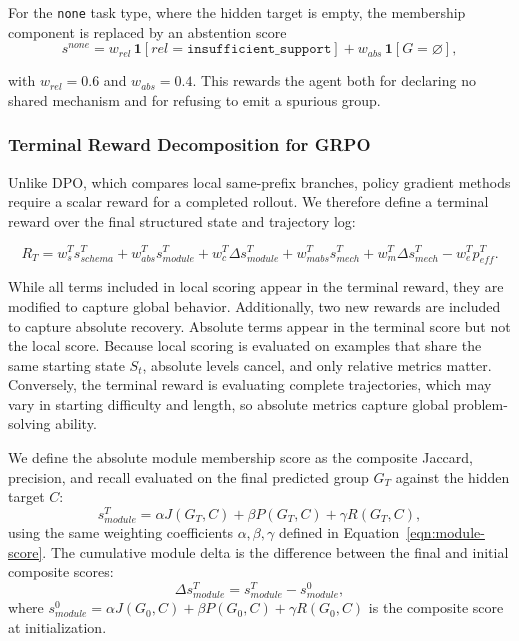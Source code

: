 \documentclass[thesis,letterpaper,12pt]{utthesis}
\begin{document}
For the \texttt{none} task type, where the hidden target is empty, the membership component is replaced by an abstention score
\[
    s^{none} = w_{rel}\, \mathbf{1}[rel = \texttt{insufficient\_support}] + w_{abs}\, \mathbf{1}[G = \varnothing],
\]

with $w_{rel} = 0.6$ and $w_{abs} = 0.4$. This rewards the agent both for declaring no shared mechanism and for refusing to emit a spurious group.

\subsubsection{Terminal Reward Decomposition for GRPO}\label{sec:terminal-reward}
Unlike DPO, which compares local same-prefix branches, policy gradient methods require a scalar reward for a completed rollout. We therefore define a terminal reward over the final structured state and trajectory log:

\begin{equation}\label{eqn:terminal-reward}
    R_T = w^T_s s^T_{schema} +w^T_{abs} s^{T}_{module} + w^T_{c} \Delta s^{T}_{module} + w^T_{mabs} s^T_{mech} + w^T_{m} \Delta s^{T}_{mech} - w^T_e p^{T}_{eff}. 
\end{equation}

While all terms included in local scoring appear in the terminal reward, they are modified to capture global behavior. Additionally, two new rewards are included to capture absolute recovery. Absolute terms appear in the terminal score but not the local score. Because local scoring is evaluated on examples that share the same starting state $S_t$, absolute levels cancel, and only relative metrics matter. Conversely, the terminal reward is evaluating complete trajectories, which may vary in starting difficulty and length, so absolute metrics capture global problem-solving ability.

We define the absolute module membership score as the composite Jaccard, precision, and recall evaluated on the final predicted group $G_T$ against the hidden target $C$:
\begin{equation}\label{eqn:terminal-module-abs}
    s^{T}_{module} = \alpha J(G_T, C) + \beta P(G_T, C) + \gamma R(G_T, C),
\end{equation}
using the same weighting coefficients $\alpha, \beta, \gamma$ defined in Equation~\ref{eqn:module-score}. The cumulative module delta is the difference between the final and initial composite scores:
\begin{equation}\label{eqn:terminal-module-delta}
    \Delta s^{T}_{module} = s^{T}_{module} - s^{0}_{module},
\end{equation}
where $s^{0}_{module} = \alpha J(G_0, C) + \beta P(G_0, C) + \gamma R(G_0, C)$ is the composite score at initialization.
\end{document}
